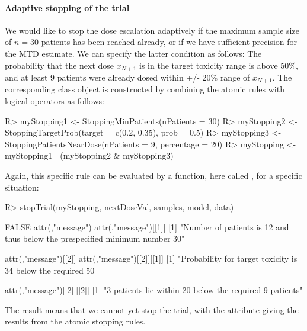 \documentclass[article]{jss}\usepackage[]{graphicx}\usepackage[]{color}
\begin{document}
\paragraph{Adaptive stopping of the trial}
We would like to stop the dose escalation adaptively if the maximum sample size of $n=30$ patients
has been reached already, or if we have sufficient precision for the MTD estimate. We can specify the latter condition as follows: The probability that the next dose $x_{N+1}$ is in the target toxicity range is above 50\%, and at least 9 patients were already dosed within +/- 20\% range of $x_{N+1}$. The corresponding  class object is constructed by combining the atomic rules with logical operators as follows:
\begin{Schunk}
\begin{Sinput}
R> myStopping1 <- StoppingMinPatients(nPatients = 30)
R> myStopping2 <- StoppingTargetProb(target = c(0.2, 0.35), prob = 0.5)
R> myStopping3 <- StoppingPatientsNearDose(nPatients = 9, percentage = 20)
R> myStopping <- myStopping1 | (myStopping2 & myStopping3)
\end{Sinput}
\end{Schunk}
Again, this specific rule can be evaluated by a function, here called , for a specific situation:
\begin{Schunk}
\begin{Sinput}
R> stopTrial(myStopping, nextDoseVal, samples, model, data)
\end{Sinput}
\begin{Soutput}
[1] FALSE
attr(,"message")
attr(,"message")[[1]]
[1] "Number of patients is 12 and thus below the prespecified
minimum number 30"

attr(,"message")[[2]]
attr(,"message")[[2]][[1]]
[1] "Probability for target toxicity is 34 %
below the required 50 %

attr(,"message")[[2]][[2]]
[1] "3 patients lie within 20%
below the required 9 patients" 
\end{Soutput}
\end{Schunk}
The result  means that we cannot yet stop the trial, with the attribute  giving the results from the atomic stopping rules.
\end{document}
